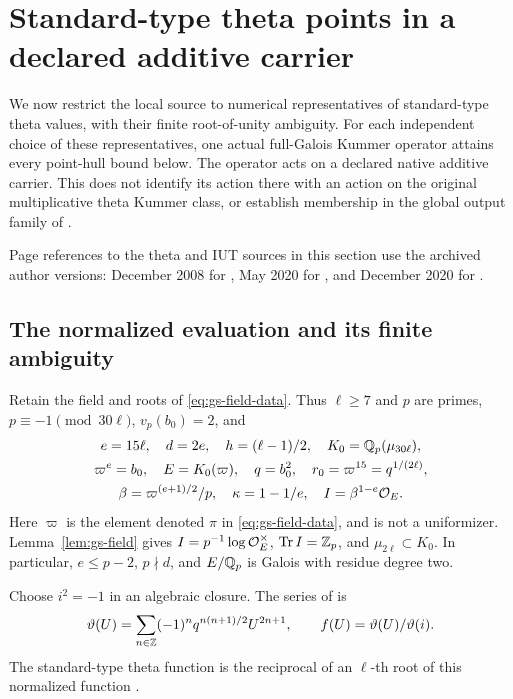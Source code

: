 \section{Standard-type theta points in a declared additive carrier}
\label{sec:uniform-theta-points}

We now restrict the local source to numerical representatives of
standard-type theta values, with their finite root-of-unity ambiguity.
For each independent choice of these representatives, one actual
full-Galois Kummer operator attains every point-hull bound below.
The operator acts on a declared native additive carrier. This does
not identify its action there with an action on the original
multiplicative theta Kummer class, or establish membership in the
global output family of \cite[Corollary~3.12]{IUT3}.

Page references to the theta and IUT sources in this section use
the archived author versions: December 2008 for \cite{MochEtaleTheta},
May 2020 for \cite{IUT1,IUT3}, and December 2020 for \cite{IUT2}.

\subsection{The normalized evaluation and its finite ambiguity}

Retain the field and roots of \eqref{eq:gs-field-data}. Thus
$\ell\ge7$ and $p$ are primes, $p\equiv-1\pmod{30\ell}$,
$v_p(b_0)=2$, and
\begin{equation}\label{eq:utp-field}
 \begin{gathered}
 e=15\ell,\quad d=2e,\quad h=(\ell-1)/2,\quad
 K_0=\mathbb Q_p(\mu_{30\ell}),\\
 \varpi^e=b_0,\quad E=K_0(\varpi),\quad q=b_0^2,\quad
 r_0=\varpi^{15}=q^{1/(2\ell)},\\
 \beta=\varpi^{(e+1)/2}/p,\quad
 \kappa=1-1/e,\quad I=\beta^{1-e}\mathcal O_E .
 \end{gathered}
\end{equation}
Here $\varpi$ is the element denoted $\pi$ in
\eqref{eq:gs-field-data}, and is not a uniformizer.
Lemma~\ref{lem:gs-field} gives
$I=p^{-1}\log\mathcal O_E^\times$, $\operatorname{Tr}I=\mathbb Z_p$,
and $\mu_{2\ell}\subset K_0$. In particular, $e\le p-2$,
$p\nmid d$, and $E/\mathbb Q_p$ is Galois with residue degree two.

Choose $i^2=-1$ in an algebraic closure. The series of
\cite[Proposition~1.4, pp.~20--21]{MochEtaleTheta} is
\begin{equation}\label{eq:utp-series}
 \vartheta(U)=
 \sum_{n\in\mathbb Z}(-1)^nq^{n(n+1)/2}U^{2n+1},
 \qquad f(U)=\vartheta(U)/\vartheta(i).
\end{equation}
The standard-type theta function is the reciprocal of an
$\ell$-th root of this normalized function
\cite[Example~3.2(ii),(iv)]{IUT1}.


